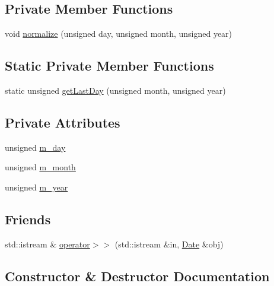 \subsection*{Private Member Functions}
\begin{DoxyCompactItemize}
\item 
void \hyperlink{classDate_a3f4544fd0b6b7d4ab893aa449c73c98a}{normalize} (unsigned day, unsigned month, unsigned year)
\end{DoxyCompactItemize}
\subsection*{Static Private Member Functions}
\begin{DoxyCompactItemize}
\item 
static unsigned \hyperlink{classDate_a0480cc260643a23afe2eb7671d6c5e79}{get\+Last\+Day} (unsigned month, unsigned year)
\end{DoxyCompactItemize}
\subsection*{Private Attributes}
\begin{DoxyCompactItemize}
\item 
unsigned \hyperlink{classDate_acb66f968e19f1f20a55001d2a88beb69}{m\+\_\+day}
\item 
unsigned \hyperlink{classDate_a856644d57cd0c87254c108cb1d85444c}{m\+\_\+month}
\item 
unsigned \hyperlink{classDate_ad326b89685e94f61827d4822ffcdefd3}{m\+\_\+year}
\end{DoxyCompactItemize}
\subsection*{Friends}
\begin{DoxyCompactItemize}
\item 
std\+::istream \& \hyperlink{classDate_a025d4abf4e083a5f10d376259aac34a2}{operator$>$$>$} (std\+::istream \&in, \hyperlink{classDate}{Date} \&obj)
\end{DoxyCompactItemize}


\subsection{Constructor \& Destructor Documentation}
\mbox{\label{classDate_a4e59ed4ba66eec61c27460c5d09fa1bd}} 
